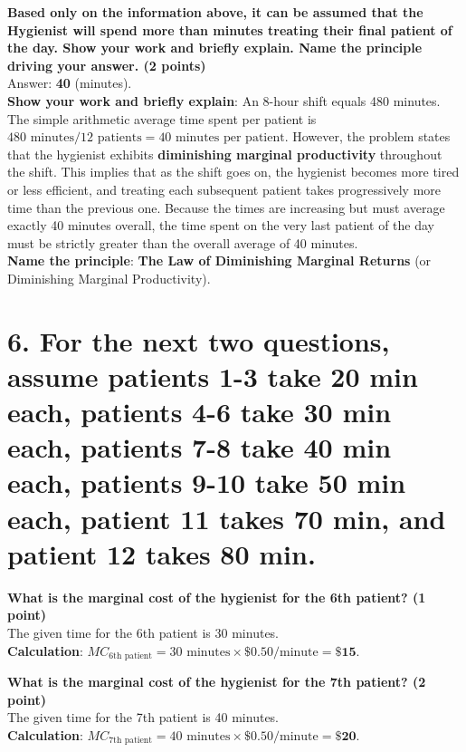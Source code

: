 \documentclass[11pt, letterpaper]{article}
\begin{document}
\textbf{Based only on the information above, it can be assumed that the Hygienist will spend more than \underline{\hspace{1cm}} minutes treating their final patient of the day. Show your work and briefly explain. Name the principle driving your answer. (2 points)} \\
Answer: \textbf{40} (minutes). \\
\textbf{Show your work and briefly explain}: An 8-hour shift equals 480 minutes. The simple arithmetic average time spent per patient is $480 \text{ minutes} / 12 \text{ patients} = 40 \text{ minutes per patient}$. However, the problem states that the hygienist exhibits \textbf{diminishing marginal productivity} throughout the shift. This implies that as the shift goes on, the hygienist becomes more tired or less efficient, and treating each subsequent patient takes progressively more time than the previous one. Because the times are increasing but must average exactly 40 minutes overall, the time spent on the very last patient of the day must be strictly greater than the overall average of 40 minutes. \\
\textbf{Name the principle}: \textbf{The Law of Diminishing Marginal Returns} (or Diminishing Marginal Productivity).

\section*{6. For the next two questions, assume patients 1-3 take 20 min each, patients 4-6 take 30 min each, patients 7-8 take 40 min each, patients 9-10 take 50 min each, patient 11 takes 70 min, and patient 12 takes 80 min.}

\textbf{What is the marginal cost of the hygienist for the 6th patient? (1 point)} \\
The given time for the 6th patient is 30 minutes. \\
\textbf{Calculation}: $MC_{\text{6th patient}} = 30 \text{ minutes} \times \$0.50/\text{minute} = \textbf{\$15}$.

\textbf{What is the marginal cost of the hygienist for the 7th patient? (2 point)} \\
The given time for the 7th patient is 40 minutes. \\
\textbf{Calculation}: $MC_{\text{7th patient}} = 40 \text{ minutes} \times \$0.50/\text{minute} = \textbf{\$20}$.
\end{document}
